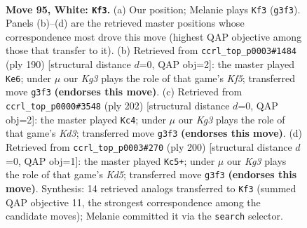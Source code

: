 \documentclass[11pt]{article}
\begin{document}
\clearpage

\begin{figure}[p]\centering
\begin{subfigure}{0.46\textwidth}\centering
\resizebox{\linewidth}{!}{%
\newchessgame
\chessboard[
  setfen={1Q6/7k/8/8/8/6K1/8/8 w - - 1 95},
  showmover=false,
  pgfstyle=straightmove, color=movearrow, markmove={g3-f3}
]}
\caption{}
\end{subfigure}\hfill
\begin{subfigure}{0.46\textwidth}\centering
\resizebox{\linewidth}{!}{%
\newchessgame
\chessboard[
  setfen={8/8/2k5/Q4K2/8/8/8/8 w - - 5 96},
  showmover=false,
  pgfstyle=straightmove, color=movearrow, markmove={f5-e6}
]}
\caption{}
\end{subfigure}
\\[4pt]
\begin{subfigure}{0.46\textwidth}\centering
\resizebox{\linewidth}{!}{%
\newchessgame
\chessboard[
  setfen={3Q4/8/8/8/k7/3K4/8/8 w - - 4 102},
  showmover=false,
  pgfstyle=straightmove, color=movearrow, markmove={d3-c4}
]}
\caption{}
\end{subfigure}\hfill
\begin{subfigure}{0.46\textwidth}\centering
\resizebox{\linewidth}{!}{%
\newchessgame
\chessboard[
  setfen={8/1k6/8/3K4/8/8/6Q1/8 w - - 3 101},
  showmover=false,
  pgfstyle=straightmove, color=movearrow, markmove={d5-c5}
]}
\caption{}
\end{subfigure}
\caption{\textbf{Move 95, White: \texttt{Kf3}.} (a) Our position; Melanie plays \texttt{Kf3} (\texttt{g3f3}). Panels (b)--(d) are the retrieved master positions whose correspondence most drove this move (highest QAP objective among those that transfer to it). (b) Retrieved from \texttt{ccrl\_top\_p0003\#1484} (ply 190) [structural distance $d$=0, QAP obj=2]: the master played \texttt{Ke6}; under $\mu$ our \emph{Kg3} plays the role of that game's \emph{Kf5}; transferred move \texttt{g3f3} \textbf{(endorses this move)}. (c) Retrieved from \texttt{ccrl\_top\_p0000\#3548} (ply 202) [structural distance $d$=0, QAP obj=2]: the master played \texttt{Kc4}; under $\mu$ our \emph{Kg3} plays the role of that game's \emph{Kd3}; transferred move \texttt{g3f3} \textbf{(endorses this move)}. (d) Retrieved from \texttt{ccrl\_top\_p0003\#270} (ply 200) [structural distance $d$=0, QAP obj=1]: the master played \texttt{Kc5+}; under $\mu$ our \emph{Kg3} plays the role of that game's \emph{Kd5}; transferred move \texttt{g3f3} \textbf{(endorses this move)}. Synthesis: 14 retrieved analogs transferred to \texttt{Kf3} (summed QAP objective 11, the strongest correspondence among the candidate moves); Melanie committed it via the \texttt{search} selector.}
\label{fig:thought-m188}
\end{figure}
\end{document}
